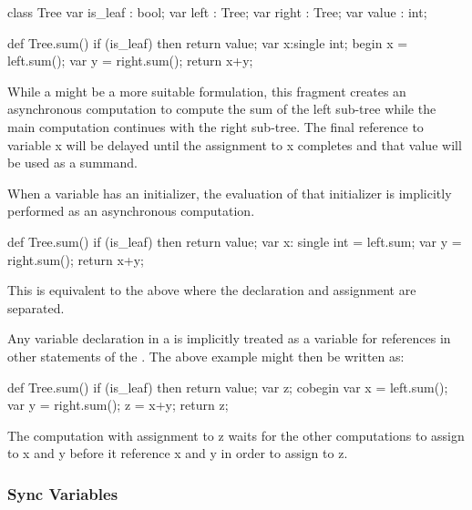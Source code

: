 \begin{example}
\begin{chapel}
class Tree {
  var is_leaf : bool;
  var left    : Tree;
  var right   : Tree;
  var value   : int;
}

def Tree.sum() {
  if (is_leaf) then return value;
  var x:single int;
  begin x = left.sum();
  var y = right.sum();
  return x+y;
}
\end{chapel}
While a  might be a more suitable formulation, this
fragment creates an asynchronous computation to compute the sum of the
left sub-tree while the main computation continues with the right
sub-tree. The final reference to variable x will be delayed until the
assignment to x completes and that value will be used as a summand.
\end{example}

When a  variable has an initializer, the evaluation of
that initializer is implicitly performed as an asynchronous
computation. 
\begin{example}
\begin{chapel}
def Tree.sum() {
  if (is_leaf) then return value;
  var x: single int = left.sum;
  var y = right.sum();
  return x+y;
}
\end{chapel}
This is equivalent to the above where the declaration and assignment are
separated.
\end{example}

Any variable declaration in a  is implicitly treated as
a  variable for references in other statements of the
.  The above example might then be written as:
\begin{example}
\begin{chapel}
def Tree.sum() {
  if (is_leaf) then return value;
  var z;
  cobegin {
    var x = left.sum();
    var y = right.sum();
    z = x+y;
  }
  return z;
}
\end{chapel}
The computation with assignment to z waits for the other computations 
to assign to x and y before it reference x and y in order to assign to z.
\end{example}

\subsubsection{Sync Variables}
\label{Sync_Variables}

